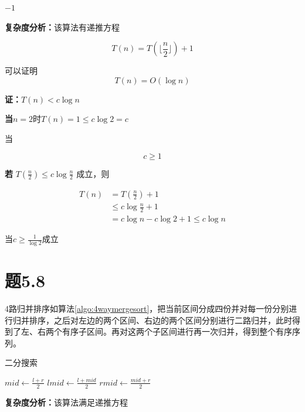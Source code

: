 \documentclass[a4paper,twoside]{article}
\begin{document}
\begin{spacing}{1.2}
\begin{algorithm}
\begin{algorithmic}[1]
		\Return $-1$
		\EndProcedure
	\end{algorithmic}
\end{algorithm}	

\textbf{复杂度分析：}该算法有递推方程

$$
T(n)=T(\lfloor \frac{n}{2} \rfloor)+1
$$

可以证明
$$
T(n)=O(\log n)
$$

\textbf{证：}$T(n)<c\log n$

\textbf{当}$n=2$时$T(n)=1\le c\log2=c$

当

$$
c \ge 1
$$

\textbf{若}
$
T(\frac{n}{2}) \le c\log \frac{n}{2}
$
成立，则

\begin{align*}
	T(n)&=T(\frac{n}{2})+1 \\
	&\le c\log \frac{n}{2}+1 \\
	&= c\log n - c\log 2+1 \le c\log n
\end{align*}

当$
c \ge \frac{1}{\log 2}
$成立

\section{题5.8}

4路归并排序如算法\ref{algo:4waymergesort}，把当前区间分成四份并对每一份分别进行归并排序，之后对左边的两个区间、右边的两个区间分别进行二路归并，此时得到了左、右两个有序子区间。再对这两个子区间进行再一次归并，得到整个有序序列。

\begin{algorithm}
	\caption{二分搜索}
	\label{algo:4waymergesort}
	\begin{algorithmic}[1]
		\State $mid \gets \frac{l+r}{2} $
		\State $lmid \gets \frac{l+mid}{2}$
		\State $rmid \gets \frac{mid+r}{2}$
		
		\State {}
		\State {}
		\State {}
		\State {}
		
		\State {}
		\State {}
		\State {}
		
		\EndProcedure
	\end{algorithmic}
\end{algorithm}	

\textbf{复杂度分析：}该算法满足递推方程


\end{spacing}
\end{document}
